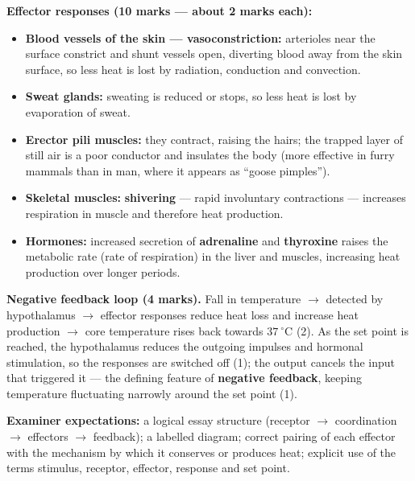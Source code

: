 \documentclass[11pt]{article}
\begin{document}
\begin{corrige}
\textbf{Effector responses (10 marks — about 2 marks each):}
\begin{itemize}
\item \textbf{Blood vessels of the skin — vasoconstriction:} arterioles near the surface constrict and shunt vessels open, diverting blood away from the skin surface, so less heat is lost by radiation, conduction and convection.
\item \textbf{Sweat glands:} sweating is reduced or stops, so less heat is lost by evaporation of sweat.
\item \textbf{Erector pili muscles:} they contract, raising the hairs; the trapped layer of still air is a poor conductor and insulates the body (more effective in furry mammals than in man, where it appears as ``goose pimples'').
\item \textbf{Skeletal muscles:} \textbf{shivering} — rapid involuntary contractions — increases respiration in muscle and therefore heat production.
\item \textbf{Hormones:} increased secretion of \textbf{adrenaline} and \textbf{thyroxine} raises the metabolic rate (rate of respiration) in the liver and muscles, increasing heat production over longer periods.
\end{itemize}

\textbf{Negative feedback loop (4 marks).} Fall in temperature $\rightarrow$ detected by hypothalamus $\rightarrow$ effector responses reduce heat loss and increase heat production $\rightarrow$ core temperature rises back towards $37\ ^\circ\mathrm{C}$ (2). As the set point is reached, the hypothalamus reduces the outgoing impulses and hormonal stimulation, so the responses are switched off (1); the output cancels the input that triggered it — the defining feature of \textbf{negative feedback}, keeping temperature fluctuating narrowly around the set point (1).

\textbf{Examiner expectations:} a logical essay structure (receptor $\rightarrow$ coordination $\rightarrow$ effectors $\rightarrow$ feedback); a labelled diagram; correct pairing of each effector with the mechanism by which it conserves or produces heat; explicit use of the terms stimulus, receptor, effector, response and set point.
\end{corrige}
\end{document}
